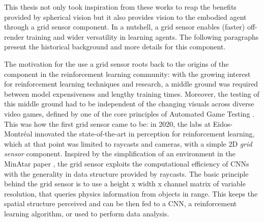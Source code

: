 

This thesis not only took inspiration from these works to reap the benefits provided by spherical vision but it also provides vision to the embodied agent through a grid sensor component. In a nutshell, a grid sensor enables (faster) off-render training and wider versatility in learning agents. The following paragraphs present the historical background and more details for this component. 


The motivation for the use a grid sensor roots back to the origins of the component in the reinforcement learning community: with the growing interest for reinforcement learning techniques and research, a middle ground was required between model expensiveness and lengthy training times. Moreover, the testing of this middle ground had to be independent of the changing visuals across diverse video games, defined by one of the core principles of Automated Game Testing \cite{unity-eidosmontreal2020}. 
This was how the first grid sensor came to be: in 2020, the labs at Eidos-Montréal \cite{unity-eidosmontreal2020} innovated the state-of-the-art in perception for reinforcement learning, which at that point was limited to raycasts and cameras, with a simple 2D \textit{grid sensor} component. Inspired by the simplification of an environment in the MinAtar paper \cite{young2019minatar}, the grid sensor exploits the computational efficiency of CNNs with the generality in data structure provided by raycasts. The basic principle behind the grid sensor is to use a height x width x channel matrix of variable resolution, that queries physics information from objects in range. This keeps the spatial structure perceived and can be then fed to a CNN, a reinforcement learning algorithm, or used to perform data analysis. 

